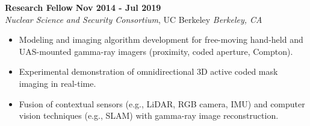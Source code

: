 \textbf{Research Fellow} \hfill \textbf{Nov 2014 - Jul 2019} \\
\textsl{Nuclear Science and Security Consortium}, UC Berkeley \hfill \textsl{Berkeley, CA} \\[-2.8ex]
\vspace{2pt}
\begin{itemize}[leftmargin=4ex] \itemsep -2pt
    \item Modeling and imaging algorithm development for free-moving hand-held and UAS-mounted gamma-ray imagers (proximity, coded aperture, Compton).
    \item Experimental demonstration of omnidirectional 3D active coded mask imaging in real-time.
    \item Fusion of contextual sensors (e.g., LiDAR, RGB camera, IMU) and computer vision techniques (e.g., SLAM) with gamma-ray image reconstruction.
\end{itemize}

